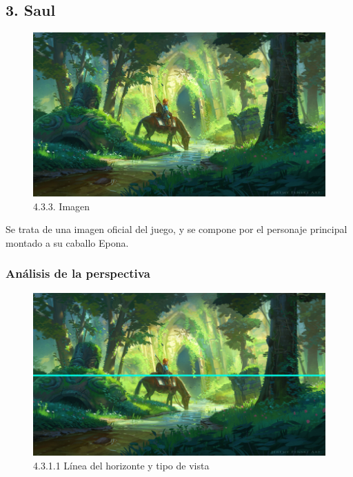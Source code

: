 \documentclass[12pt]{article}
\begin{document}
    \subsection{3. Saul}
    \begin{figure}[H]
      \centering
      \includegraphics[scale=0.7]{images/Saúl/Sección 3/EA_img3_0Main.png}
      \caption{\small 4.3.3. Imagen}
    \end{figure}
    Se trata de una imagen oficial del juego, y se compone por el personaje principal montado a su caballo Epona.

    
        \subsubsection{Análisis de la perspectiva}


    \begin{figure}[H]
      \centering
      \includegraphics[scale=0.7]{images/Saúl/Sección 3/EA_img3_1Perspectiva_1LineaTierra-TipoVista.png}
      \caption{\small 4.3.1.1 Línea del horizonte y tipo de vista}
    \end{figure}
\end{document}
